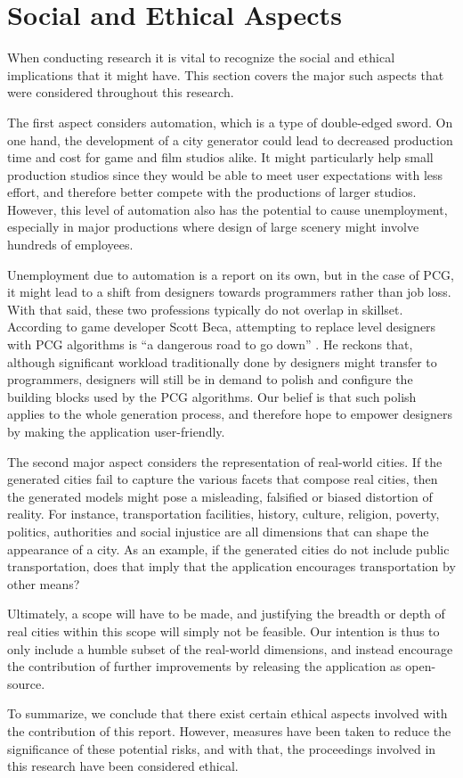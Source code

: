 \section{Social and Ethical Aspects}

When conducting research it is vital to recognize the social and ethical implications that it might have.
This section covers the major such aspects that were considered throughout this research. 

The first aspect considers automation, which is a type of double-edged sword.
On one hand, the development of a city generator could lead to decreased production time and cost for game and film studios alike.
It might particularly help small production studios since they would be able to meet user expectations with less effort, and therefore better compete with the productions of larger studios.
However, this level of automation also has the potential to cause unemployment, especially in major productions where design of large scenery might involve hundreds of employees.

Unemployment due to automation is a report on its own, but in the case of PCG, it might lead to a shift from designers towards programmers rather than job loss.
With that said, these two professions typically do not overlap in skillset.
According to game developer Scott Beca, attempting to replace level designers with PCG algorithms is ``a dangerous road to go down'' \cite{gamasutra}.
He reckons that, although significant workload traditionally done by designers might transfer to programmers, designers will still be in demand to polish and configure the building blocks used by the PCG algorithms.
Our belief is that such polish applies to the whole generation process, and therefore hope to empower designers by making the application user-friendly.

The second major aspect considers the representation of real-world cities.
If the generated cities fail to capture the various facets that compose real cities, then the generated models might pose a misleading, falsified or biased distortion of reality.
For instance, transportation facilities, history, culture, religion, poverty, politics, authorities and social injustice are all dimensions that can shape the appearance of a city.
As an example, if the generated cities do not include public transportation, does that imply that the application encourages transportation by other means?

Ultimately, a scope will have to be made, and justifying the breadth or depth of real cities within this scope will simply not be feasible.
Our intention is thus to only include a humble subset of the real-world dimensions, and instead encourage the contribution of further improvements by releasing the application as open-source.

To summarize, we conclude that there exist certain ethical aspects involved with the contribution of this report.
However, measures have been taken to reduce the significance of these potential risks, and with that, the proceedings involved in this research have been considered ethical.

\newpage